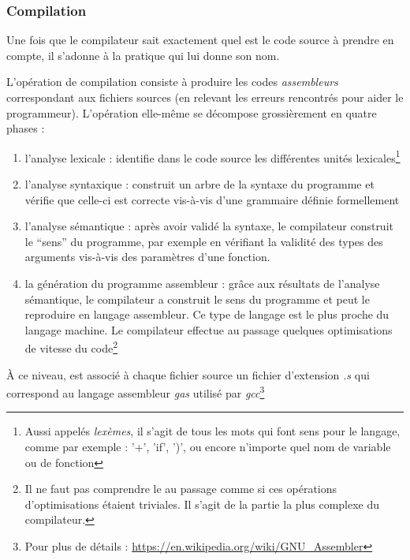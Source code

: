 \documentclass[../../../main.tex]{subfiles}
\begin{document}
\subsubsection{Compilation}
\label{ssub:compilation}
Une fois que le compilateur sait exactement quel est le code source à prendre en compte, il s'adonne à la pratique qui lui donne son nom.

L'opération de compilation consiste à produire les codes \textit{assembleurs} correspondant aux fichiers sources (en relevant les erreurs rencontrés pour aider le programmeur). L'opération elle-même se décompose grossièrement en quatre phases :
\begin{enumerate}
	\item l'analyse lexicale : identifie dans le code source les différentes unités lexicales\footnote{Aussi appelés \textit{lexèmes}, il s'agit de tous les mots qui font sens pour le langage, comme par exemple : '+', 'if', ')', ou encore n'importe quel nom de variable ou de fonction}
	\item l'analyse syntaxique : construit un arbre de la syntaxe du programme et vérifie que celle-ci est correcte vis-à-vis d'une grammaire définie formellement
	\item l'analyse sémantique : après avoir validé la syntaxe, le compilateur construit le ``sens'' du programme, par exemple en vérifiant la validité des types des arguments vis-à-vis des paramètres d'une fonction.
	\item la génération du programme assembleur : grâce aux résultats de l'analyse sémantique, le compilateur a construit le sens du programme et peut le reproduire en langage assembleur. Ce type de langage est le plus proche du langage machine. Le compilateur effectue au passage quelques optimisations de vitesse du code\footnote{Il ne faut pas comprendre le \og au passage \fg comme si ces opérations d'optimisations étaient triviales. Il s'agit de la partie la plus complexe du compilateur.}
\end{enumerate}
À ce niveau, est associé à chaque fichier source un fichier d'extension \textit{.s} qui correspond au langage assembleur \textit{gas} utilisé par \textit{gcc}\footnote{Pour plus de détails : \url{https://en.wikipedia.org/wiki/GNU_Assembler}}

\begin{minipage}{\textwidth}
	\begin{center}
		
	\end{center}
\end{minipage}
\end{document}
